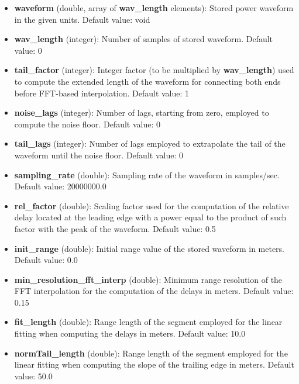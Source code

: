 \begin{itemize}
\item {\bf waveform} (double, array of {\bf wav\_length} elements): Stored power waveform in the given units. Default value: void

\item {\bf wav\_length} (integer): Number of samples of stored waveform. Default value: 0

\item {\bf tail\_factor} (integer): Integer factor (to be multiplied by {\bf wav\_length}) used to compute the extended length of the waveform for connecting both ends before FFT-based interpolation. Default value: 1

\item {\bf noise\_lags} (integer): Number of lags, starting from zero, employed to compute the noise floor. Default value: 0

\item {\bf tail\_lags} (integer): Number of lags employed to extrapolate the tail of the waveform until the noise floor. Default value: 0

\item {\bf sampling\_rate} (double): Sampling rate of the waveform in samples/sec. Default value: 20000000.0

\item {\bf rel\_factor} (double): Scaling factor used for the computation of the relative delay located at the leading edge with a power equal to the product of such factor with the peak of the waveform. Default value: 0.5

\item {\bf init\_range} (double): Initial range value of the stored waveform in meters. Default value: 0.0

\item {\bf min\_resolution\_fft\_interp} (double): Minimum range resolution of the FFT interpolation for the computation of the delays in meters. Default value: 0.15

\item {\bf fit\_length} (double): Range length of the segment employed for the linear fitting when computing the delays in meters. Default value: 10.0

\item {\bf normTail\_length} (double): Range length of the segment employed for the linear fitting when computing the slope of the trailing edge in meters. Default value: 50.0
\end{itemize}

